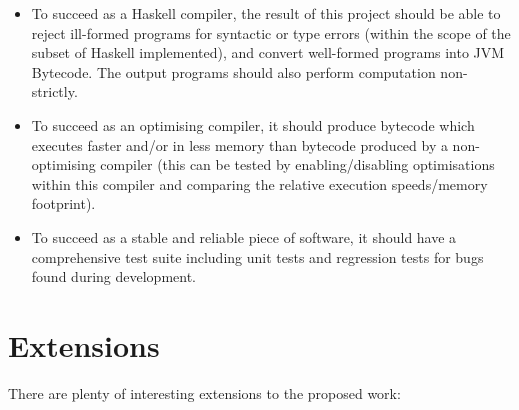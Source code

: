 \documentclass[12pt]{article}
\begin{document}
\begin{itemize}
\item
{
    To succeed as a Haskell compiler, the result of this project should be able to reject ill-formed programs for
    syntactic or type errors (within the scope of the subset of Haskell implemented), and convert well-formed programs
    into JVM Bytecode. The output programs should also perform computation non-strictly.
}
\item
{
    To succeed as an optimising compiler, it should produce bytecode which executes faster and/or in less memory than
    bytecode produced by a non-optimising compiler (this can be tested by enabling/disabling optimisations within this
    compiler and comparing the relative execution speeds/memory footprint).
}
\item
{
    To succeed as a stable and reliable piece of software, it should have a comprehensive test suite including unit
    tests and regression tests for bugs found during development.
}
\end{itemize}


\section*{Extensions}

There are plenty of interesting extensions to the proposed work:
\end{document}
